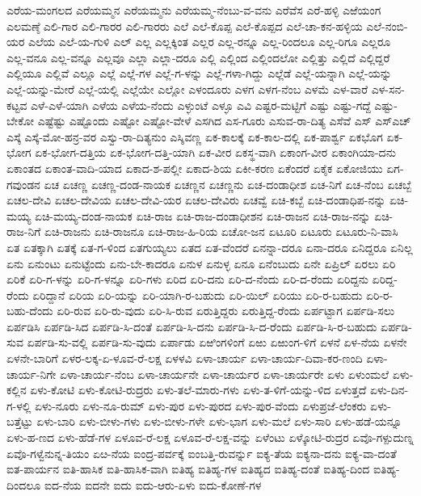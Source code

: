 ಎರೆಯ-ಮಂಗಲದ
ಎರೆಯಮ್ಮನ
ಎರೆಯಮ್ಮನು
ಎರೆಯಮ್ಮ-ನೆಂಬು-ವ-ವನು
ಎರೆವೆಸ
ಎರೆ-ಹಳ್ಳಿ
ಎಱೆಯಂಗ
ಎಲಮಣ್ಠೆ
ಎಲಿ-ಗಾರ
ಎಲಿ-ಗಾರರ
ಎಲಿ-ಗಾರರು
ಎಲೆ
ಎಲೆ-ಕೊಪ್ಪ
ಎಲೆ-ಕೊಪ್ಪದ
ಎಲೆ-ಚಾ-ಕನ-ಹಳ್ಳಿಯ
ಎಲೆ-ನಂಬಿ-ಯರ
ಎಲೆಯ
ಎಲೆ-ಯ-ಗುಳಿ
ಎಲ್
ಎಲ್ಲ
ಎಲ್ಲಕ್ಕಿಂತ
ಎಲ್ಲರ
ಎಲ್ಲ-ರನ್ನೂ
ಎಲ್ಲ-ರಿಂದಲೂ
ಎಲ್ಲ-ರಿಗೂ
ಎಲ್ಲರೂ
ಎಲ್ಲ-ವನೂ
ಎಲ್ಲ-ವನ್ನೂ
ಎಲ್ಲವೂ
ಎಲ್ಲಾ
ಎಲ್ಲಾ-ದರೂ
ಎಲ್ಲಿ
ಎಲ್ಲಿಂದ
ಎಲ್ಲಿಂದಲೋ
ಎಲ್ಲಿತ್ತು
ಎಲ್ಲಿದೆ
ಎಲ್ಲಿದ್ದರೆ
ಎಲ್ಲಿಯೂ
ಎಲ್ಲಿವೆ
ಎಲ್ಲೂ
ಎಲ್ಲೆ
ಎಲ್ಲೆ-ಗಳ
ಎಲ್ಲೆ-ಗ-ಳನ್ನು
ಎಲ್ಲೆ-ಗಳಾ-ಗಿದ್ದು
ಎಲ್ಲೆಡೆ
ಎಲ್ಲೆ-ಯನ್ನಾಗಿ
ಎಲ್ಲೆ-ಯನ್ನು
ಎಲ್ಲೆ-ಯನ್ನು-ಮೇರೆ
ಎಲ್ಲೆ-ಯಲ್ಲಿ
ಎಲ್ಲೆಯೇ
ಎಲ್ಲೋ
ಎಳಂದೂರು
ಎಳಗ
ಎಳಗ-ನೆಂಬ
ಎಳಮೆ
ಎಳ-ವಾರೆ
ಎಳ-ಸನ-ಕಟ್ಟವ
ಎಳೆ-ಎಳೆ-ಯಾಗಿ
ಎಳೆಯ
ಎಳೆಯ-ನೆಂದು
ಎಳ್ಳುಂಟೆ
ಎಳ್ಳೂ
ಎವಿ
ಎಷ್ಟರ-ಮಟ್ಟಿಗೆ
ಎಷ್ಟು
ಎಷ್ಟು-ಗದ್ದೆ
ಎಷ್ಟು-ಬೇಕೋ
ಎಷ್ಟೆಷ್ಟು
ಎಷ್ಟೊಂದು
ಎಷ್ಟೋ
ಎಷ್ಟೋ-ವೇಳೆ
ಎಸಗಿದ
ಎಸ-ಗೂರು
ಎಸುವ-ರಾ-ದಿತ್ಯ
ಎಸೆವೆ
ಎಸ್
ಎಸ್ಎಚ್
ಎಸ್ಕೆ
ಎಸ್ಕೆ-ಮೋ-ಹನ್ರ-ವರ
ಎಸ್ವು-ರಾ-ದಿತ್ಯನುಂ
ಎಸ್ಶಿವಣ್ಣ
ಏಕ-ಕಾಲಕ್ಕೆ
ಏಕ-ಕಾಲ-ದಲ್ಲಿ
ಏಕ-ಪಾರ್ಶ್ವ
ಏಕಭೊಗ
ಏಕ-ಭೋಗ
ಏಕ-ಭೋಗ-ದತ್ತಿಯ
ಏಕ-ಭೋಗ-ದತ್ತಿ-ಯಾಗಿ
ಏಕ-ವೀರ
ಏಕಸ್ಥ-ವಾಗಿ
ಏಕಾಂಗ-ವೀರ
ಏಕಾಂಗಿಯಾ-ದನು
ಏಕಾಂತದ
ಏಕಾಂತ-ವಾದಿ-ಯಾದ
ಏಕಾದ-ಶ-ಪಲ್ಲೀ
ಏಕಾದ-ಶಿಯ
ಏಕೀ-ಕರಣ
ಏಕೆಂದರೆ
ಏಕೈಕ
ಏಕೋಜಿಯು
ಏಗ-ಗವುಂಡನ
ಏಚ
ಏಚಣ್ಣ
ಏಚಣ್ಣ-ದಂಡ-ನಾಯಕ
ಏಚಣ್ಣನ
ಏಚಣ್ಣನು
ಏಚ-ದಂಡಾಧೀಶ
ಏಚ-ನಿಗೆ
ಏಚ-ನೆಂಬ
ಏಚಬ್ಬೆ
ಏಚಲ-ದೇವಿ
ಏಚಲ-ದೇವಿಯ
ಏಚಲ-ದೇವಿ-ಯರ
ಏಚಲ-ದೇವಿರು
ಏಚವ್ವೆ
ಏಚಿ-ಕಬ್ಬೆ
ಏಚಿ-ದಂಡಾಧಿಪ-ನನ್ನು
ಏಚಿ-ಮಯ್ಯ
ಏಚಿ-ಮಯ್ಯ-ದಂಡ-ನಾಯಕ
ಏಚಿ-ರಾಜ
ಏಚಿ-ರಾಜ-ದಂಡಾಧೀಶನ
ಏಚಿ-ರಾಜನ
ಏಚಿ-ರಾಜ-ನನ್ನು
ಏಚಿ-ರಾಜ-ನಿಗೆ
ಏಚಿ-ರಾಜನು
ಏಚಿ-ರಾಜನೂ
ಏಚಿ-ರಾಜ-ಹಿ-ರಿಯ
ಏಚೋ-ಜನ
ಏಟೂರಿ
ಏಟೂರು
ಏಟೂರು-ನಿ-ವಾಸಿ
ಏತ
ಏತಕ್ಕಾಗಿ
ಏತಕ್ಕೆ
ಏತ-ಗ-ಳಿಂದ
ಏತಗುಯ್ಯಲು
ಏತದ
ಏತ-ವೆಂದರೆ
ಏನನ್ನಾ-ದರೂ
ಏನಾ-ದರೂ
ಏನಿದ್ದರೂ
ಏನಿಲ್ಲ
ಏನು
ಏನುಂಟು
ಏನುಟ್ಟೆಂದು
ಏನು-ಬೇ-ಕಾದರೂ
ಏನುಳ
ಏನುಳ್ಳ
ಏನೂ
ಏನೆಂಬುದು
ಏನೇ
ಏಪ್ರಿಲ್
ಏರಲು
ಏರಿ
ಏರಿಕೆ
ಏರಿ-ಗ-ಳನ್ನು
ಏರಿ-ಗ-ಳನ್ನೂ
ಏರಿ-ಗಳು
ಏರಿದ
ಏರಿ-ದನು
ಏರಿ-ದ-ನೆಂದು
ಏರಿ-ದ-ರೆಂದು
ಏರಿದ್ದನು
ಏರಿದ್ದ-ರೆಂದು
ಏರಿದ್ದಾನೆ
ಏರಿಯ
ಏರಿ-ಯನ್ನು
ಏರಿ-ಯಾಗಿ-ರ-ಬಹುದು
ಏರಿ-ಯಿಲ್
ಏರಿಯು
ಏರಿ-ರ-ಬಹುದು
ಏರಿ-ರ-ಬಹು-ದೆಂದು
ಏರಿ-ರುವ
ಏರಿ-ರು-ವುದು
ಏರಿ-ಸಿ-ರುವ
ಏರುತ್ತಿದ್ದರು
ಏರುತ್ತಿದ್ದ-ರೆಂದು
ಏರ್ಪಟ್ಟಾಗ
ಏರ್ಪಡಿ-ಸಲು
ಏರ್ಪಡಿಸಿ
ಏರ್ಪಡಿ-ಸಿದ
ಏರ್ಪಡಿ-ಸಿ-ದಂತೆ
ಏರ್ಪಡಿ-ಸಿ-ದನು
ಏರ್ಪಡಿ-ಸಿ-ದ-ರೆಂದು
ಏರ್ಪಡಿ-ಸಿ-ರ-ಬಹುದು
ಏರ್ಪಡಿ-ಸುವ
ಏರ್ಪಡಿ-ಸು-ವಲ್ಲಿ
ಏರ್ಪಡಿ-ಸು-ವುದು
ಏರ್ಪಾಡು
ಏಱಿಂಗಳಿಂಗೆ
ಏಱು
ಏಱುಂಗ-ಳಿಗೆ
ಏಳನೆ
ಏಳ-ನೆಯ
ಏಳನೇ
ಏಳನೇ-ಬಾರಿಗೆ
ಏಳರ-ಲಕ್ಕ-ಏ-ಳೂವ-ರೆ-ಲಕ್ಷ
ಏಳಳವಿ
ಏಳಾ-ಚಾರ್ಯ
ಏಳಾ-ಚಾರ್ಯ-ದಿವಾ-ಕರ-ಣಂದಿ
ಏಳಾ-ಚಾರ್ಯ-ನಿಗೇ
ಏಳಾ-ಚಾರ್ಯ-ನೆಂಬ
ಏಳಾ-ಚಾರ್ಯನೇ
ಏಳಾ-ಚಾರ್ಯರ
ಏಳಾ-ಚಾರ್ಯರೇ
ಏಳು
ಏಳುಂಮಲೆ
ಏಳು-ಕಲ್ಲಿನ
ಏಳು-ಕೋಟಿ
ಏಳು-ಕೋಟಿ-ರುದ್ರರು
ಏಳು-ತಲೆ-ಮಾರು-ಗಳು
ಏಳು-ತ-ಳಿಗೆ-ಯನ್ನು-ಳಿದ
ಏಳುತ್ತದೆ
ಏಳು-ದಿನ-ಗ-ಳಲ್ಲಿ
ಏಳು-ನೂರು
ಏಳು-ನೂ-ರುಮ್
ಏಳು-ಪುರ
ಏಳು-ಪುರದ
ಏಳು-ಪುರ-ವೆಂದು
ಏಳುಪ್ರಜೆ-ಲೆಂಕರು
ಏಳು-ಬತ್ತೆಟ್ಟು
ಏಳು-ಬಾರಿ
ಏಳು-ಬೀಳು-ಗಳು
ಏಳು-ಬೀಳು-ಗಳೇ
ಏಳು-ಭಾಗ
ಏಳು-ಮಲೆ
ಏಳು-ಸಾರಿ
ಏಳು-ಹಡೆ-ಯನ್ನೂ
ಏಳು-ಹ-ಣದ
ಏಳು-ಹೆಡೆ-ಗಳ
ಏಳೂವ-ರೆ-ಲಕ್ಷ
ಏಳೂವ-ರೆ-ಲಕ್ಷ-ವನ್ನು
ಏಳೆಂಟು
ಏಳ್ಕೋಟಿ-ರುದ್ರರ
ಏವೊ-ಗಳ್ಪುದುಣ್ನ
ಏವೊ-ಗಳ್ವೆನುನ್ನ-ತಿಯಂ
ಏೞ-ನೆಯ
ಐಂದ್ರ-ಪರ್ವಕ್ಕೆ
ಐಂಬತ್ತಿ-ರುವರ್ನ್ನು
ಐಕ್ಯ-ತೆಯ
ಐಕ್ಯನಾ-ದನು
ಐಕ್ಯ-ವಾ-ದಂತೆ
ಐತ-ಪಾರ್ಯನ
ಐತಿ-ಹಾಸಿಕ
ಐತಿ-ಹಾಸಿಕ-ವಾಗಿ
ಐತಿಹ್ಯ
ಐತಿಹ್ಯ-ಗಳ
ಐತಿಹ್ಯದ
ಐತಿಹ್ಯ-ದಂತೆ
ಐತಿಹ್ಯ-ದಿಂದ
ಐತಿಹ್ಯ-ದಿಂದಲೂ
ಐದ-ನೆಯ
ಐದನೇ
ಐದು
ಐದು-ಆರು-ಏಳು
ಐದು-ಕೋಣೆ-ಗಳ
